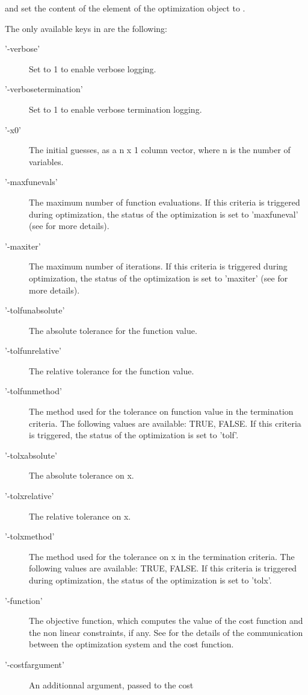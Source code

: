\begin{Details}\relax
{} and  set the content of the
 element of the optimization object  to .

The only available keys in  are the following:
\begin{description}

\item['-verbose'] Set to 1 to enable verbose logging.
\item['-verbosetermination'] Set to 1 to enable verbose termination
logging.
\item['-x0'] The initial guesses, as a n x 1 column vector, where n is the
number of variables.
\item['-maxfunevals'] The maximum number of function evaluations. If this
criteria is triggered during optimization, the status of the optimization
is set to 'maxfuneval' (see
 for more details).
\item['-maxiter'] The maximum number of iterations. If this criteria is
triggered during optimization, the status of the optimization is set to
'maxiter' (see 
for more details).
\item['-tolfunabsolute'] The absolute tolerance for the function value.
\item['-tolfunrelative'] The relative tolerance for the function value.
\item['-tolfunmethod'] The method used for the tolerance on function value
in the termination criteria. The following values are available: TRUE,
FALSE. If this criteria is triggered, the status of the optimization is
set to 'tolf'.
\item['-tolxabsolute'] The absolute tolerance on x.
\item['-tolxrelative'] The relative tolerance on x.
\item['-tolxmethod'] The method used for the tolerance on x in the
termination criteria. The following values are available: TRUE, FALSE. If
this criteria is triggered during optimization, the status of the
optimization is set to 'tolx'.
\item['-function'] The objective function, which computes the value of the
cost function and the non linear constraints, if any. See
 for the details of
the communication between the optimization system and the cost function.
\item['-costfargument'] An additionnal argument, passed to the cost

\end{description}
\end{Details}

